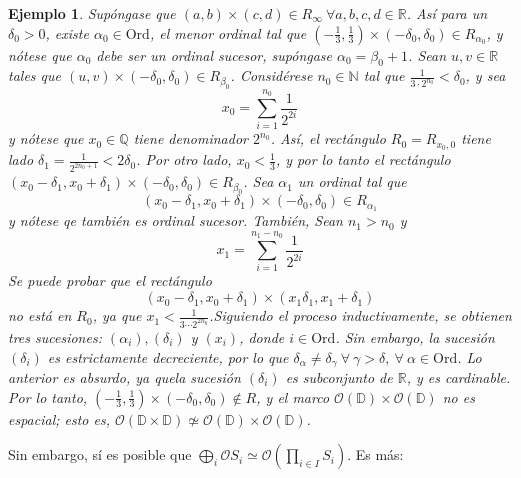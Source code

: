 \documentclass[12pt,letterpaper,titlepage]{article}
\newtheorem*{exa}{Ejemplo}
\theoremstyle{definition}
\newcommand\<{\langle}
\renewcommand\>{\rangle}
\newcommand{\Ord}{\mathrm{Ord}}
\begin{document}
\begin{exa}
Supóngase que $(a,b)\times(c,d)\in R_\infty \ \forall a,b,c,d\in \mathbb{R}$. Así para un $\delta_0>0$, existe $\alpha_0\in\Ord$, el menor ordinal tal que $(-\tfrac{1}{3},\tfrac{1}{3})\times(-\delta_0,\delta_0)\in R_{\alpha_0}$, y nótese que $\alpha_0$ debe ser un ordinal sucesor, supóngase $\alpha_0=\beta_0+1$. Sean $u,v\in\mathbb{R}$ tales que $(u,v)\times(-\delta_0,\delta_0)\in R_{\beta_0}$. Considérese $n_0\in\mathbb{N}$ tal que $\frac{1}{3\cdot 2^{n_0}}<\delta_0$, y sea 
$$x_0=\sum\limits_{i=1}^{n_0}\frac{1}{2^{2i}}$$
y nótese que $x_0\in\mathbb{Q}$ tiene denominador $2^{n_0}$. Así, el rectángulo $R_0=R_{x_0,0}$ tiene lado $\delta_1=\tfrac{1}{2^{2n_0+1}}<2\delta_0$. Por otro lado, $x_0<\tfrac{1}{3}$, y por lo tanto el rectángulo $(x_0-\delta_1,x_0+\delta_1)\times(-\delta_0,\delta_0)\in R_{\beta_0}$.
Sea $\alpha_1$ un ordinal tal que 
$$(x_0-\delta_1,x_0+\delta_1)\times(-\delta_0,\delta_0)\in R_{\alpha_1}$$
y nótese qe también es ordinal sucesor. También,  Sean $n_1>n_0$ y   
$$x_1=\sum\limits_{i=1}^{n_1-n_0}\frac{1}{2^{2i}}$$
Se puede probar que el rectángulo
$$(x_0-\delta_1,x_0+\delta_1)\times(x_1\delta_1,x_1+\delta_1)$$
no está en $R_0$, ya que $x_1<\frac{1}{3\cdots 2^{2n_0}}$.Siguiendo el proceso inductivamente, se obtienen tres sucesiones: $(\alpha_i), (\delta_i)$ y $(x_i)$, donde $i\in \Ord$. Sin embargo, la sucesión $(\delta_i)$ es estrictamente decreciente, por lo que $\delta_\alpha\neq\delta_{\gamma} \ \forall \ \gamma>\delta,  \ \forall \ \alpha\in\Ord$. Lo anterior es absurdo, ya quela sucesión $(\delta_i)$ es subconjunto de $\mathbb{R}$, y es cardinable. Por lo tanto, $(-\frac{1}{3}, \frac{1}{3})\times (-\delta_0,\delta_0)\notin R$, y el marco $\mathcal{O}(\mathbb{D})\times\mathcal{O}(\mathbb{D})$ no es espacial; esto es, 
$\mathcal{O}(\mathbb{D}\times\mathbb{D})\not\simeq\mathcal{O}(\mathbb{D})\times\mathcal{O}(\mathbb{D})$.
\end{exa}

Sin embargo, sí es posible que $\bigoplus\limits_{i}\mathcal{O}S_i\simeq\mathcal{O}(\prod\limits_{i\in I}S_i)$. Es más:
\end{document}
